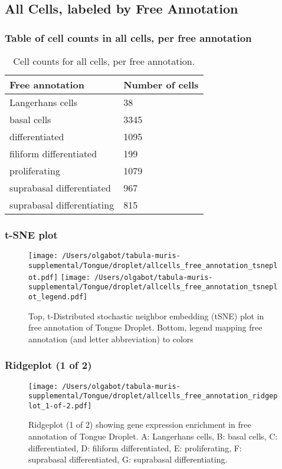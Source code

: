 \clearpage
\subsection{All Cells, labeled by Free Annotation}
\subsubsection{Table of cell counts in all cells, per free annotation}\begin{table}[h]
\centering
\label{my-label}
\begin{tabular}{@{}ll@{}}
\toprule

Free annotation& Number of cells \\ \midrule
Langerhans cells & 38 \\

basal cells & 3345 \\

differentiated & 1095 \\

filiform differentiated & 199 \\

proliferating & 1079 \\

suprabasal differentiated & 967 \\

suprabasal differentiating & 815 \\
\bottomrule
\end{tabular}
\caption{Cell counts for all cells, per free annotation.}
\end{table}

\clearpage
\subsubsection{t-SNE plot}
\begin{figure}[h]
\centering
\texttt{[image: /Users/olgabot/tabula-muris-supplemental/Tongue/droplet/allcells\_free\_annotation\_tsneplot.pdf]}
\texttt{[image: /Users/olgabot/tabula-muris-supplemental/Tongue/droplet/allcells\_free\_annotation\_tsneplot\_legend.pdf]}
\caption{Top, t-Distributed stochastic neighbor embedding (tSNE) plot  in free annotation of Tongue Droplet. Bottom, legend mapping free annotation (and letter abbreviation) to colors}
\end{figure}


\clearpage
\clearpage
\subsubsection{Ridgeplot (1 of 2)}
\begin{figure}[h]
\centering
\texttt{[image: /Users/olgabot/tabula-muris-supplemental/Tongue/droplet/allcells\_free\_annotation\_ridgeplot\_1-of-2.pdf]}

\caption{ Ridgeplot (1 of 2)  showing gene expression enrichment in free annotation of Tongue Droplet. A: Langerhans cells, B: basal cells, C: differentiated, D: filiform differentiated, E: proliferating, F: suprabasal differentiated, G: suprabasal differentiating.}
\end{figure}



